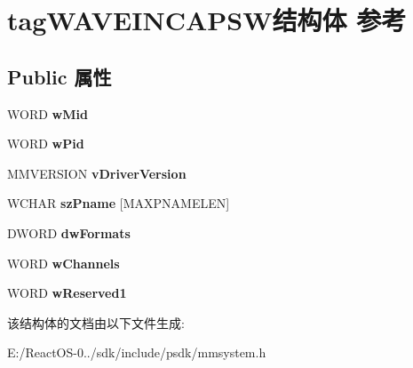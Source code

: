 \hypertarget{structtag_w_a_v_e_i_n_c_a_p_s_w}{}\section{tag\+W\+A\+V\+E\+I\+N\+C\+A\+P\+S\+W结构体 参考}
\label{structtag_w_a_v_e_i_n_c_a_p_s_w}
\subsection*{Public 属性}
\begin{DoxyCompactItemize}
\item 
\mbox{\label{structtag_w_a_v_e_i_n_c_a_p_s_w_af06a8763c7f3af47da08712640b731c4}} 
W\+O\+RD {\bfseries w\+Mid}
\item 
\mbox{\label{structtag_w_a_v_e_i_n_c_a_p_s_w_a7194b3310907b9b224a838497c9e47d0}} 
W\+O\+RD {\bfseries w\+Pid}
\item 
\mbox{\label{structtag_w_a_v_e_i_n_c_a_p_s_w_a68219a69d7d1f783e8bb6fdd66a665c5}} 
M\+M\+V\+E\+R\+S\+I\+ON {\bfseries v\+Driver\+Version}
\item 
\mbox{\label{structtag_w_a_v_e_i_n_c_a_p_s_w_a1984427096c99b6e0acd81b0eb3612b6}} 
W\+C\+H\+AR {\bfseries sz\+Pname} \mbox{[}M\+A\+X\+P\+N\+A\+M\+E\+L\+EN\mbox{]}
\item 
\mbox{\label{structtag_w_a_v_e_i_n_c_a_p_s_w_a7e24d5e816fdf9091539fd4fe4c6dce5}} 
D\+W\+O\+RD {\bfseries dw\+Formats}
\item 
\mbox{\label{structtag_w_a_v_e_i_n_c_a_p_s_w_a09f0a965f7d10982c0b63f669963ce9c}} 
W\+O\+RD {\bfseries w\+Channels}
\item 
\mbox{\label{structtag_w_a_v_e_i_n_c_a_p_s_w_abf5439e5fad1d9a1bd5ff84014203b48}} 
W\+O\+RD {\bfseries w\+Reserved1}
\end{DoxyCompactItemize}


该结构体的文档由以下文件生成\+:\begin{DoxyCompactItemize}
\item 
E\+:/\+React\+O\+S-\/0../sdk/include/psdk/mmsystem.\+h\end{DoxyCompactItemize}
